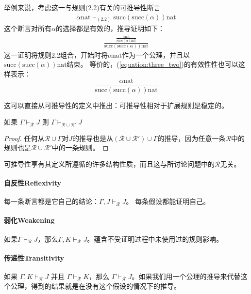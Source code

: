 举例来说，考虑这一与规则(2.2)有关的可推导性断言
\begin{equation}
    \begin{aligned} %
        \alpha \text{nat} \vdash_{(2.2)} \text{succ}(\text{succ}(\alpha)) \text{nat} \label{equation:three_two}
    \end{aligned}
\end{equation}
这个断言对所有$\alpha$的选择都是有效的，推导证明如下：
\begin{equation}
    \begin{aligned} %
        \frac{\frac{\alpha \text{nat}}{\text{succ}(\alpha) \text{nat}}}{\text{succ}(\text{succ}(\alpha)) \text{nat}} \label{equation:three_three}
    \end{aligned}
\end{equation}
这一证明将规则2.2组合，开始时将$\alpha \text{nat}$作为一个公理，并且以$\text{succ}(\text{succ}(\alpha)) \text{nat}$结束。
等价的，(\ref{equation:three_two})的有效性性也可以这样表示：
$$\frac{\alpha \text{nat}}{\text{succ}(\text{succ}(\alpha)) \text{nat}}$$

这可以直接从可推导性的定义中推出：可推导性相对于扩展规则是稳定的。

\begin{theorem}[稳定性]\label{theorem:stability}
    如果 $\Gamma \vdash_{\mathcal{R}} J$ 则 $\Gamma \vdash_{\mathcal{R} \cup \mathcal{R}'} J$
\end{theorem}
\begin{proof}
    任何从$\mathcal{R}\cup \Gamma$对$J$的推导也是从$(\mathcal{R} \cup \mathcal{R}') \cup \Gamma$的推导，因为任意一条$\mathcal{R}$中的规则也是$\mathcal{R} \cup \mathcal{R}'$中的一条规则。
    \end{proof}
可推导性享有其定义所遵循的许多结构性质，而且这与所讨论问题中的$\mathcal{R}$无关。

\paragraph{自反性Reflexivity} 
每一条断言都是它自己的结论：$\Gamma,J\vdash_{\mathcal{R}}J$。
每条假设都能证明自己。

\paragraph{弱化Weakening} 如果$\Gamma \vdash_{\mathcal{R}}J$，那么$\Gamma,K\vdash_{\mathcal{R}}J$。蕴含不受证明过程中未使用过的规则影响。
\paragraph{传递性Transitivity} 如果 $\Gamma,K\vdash_{\mathcal{R}}J$ 并且 $\Gamma \vdash_{\mathcal{R}} K$，那么 $\Gamma \vdash_{\mathcal{R}} J$。如果我们用一个公理的推导来代替这个公理，得到的结果就是在没有这个假设的情况下的推导。


